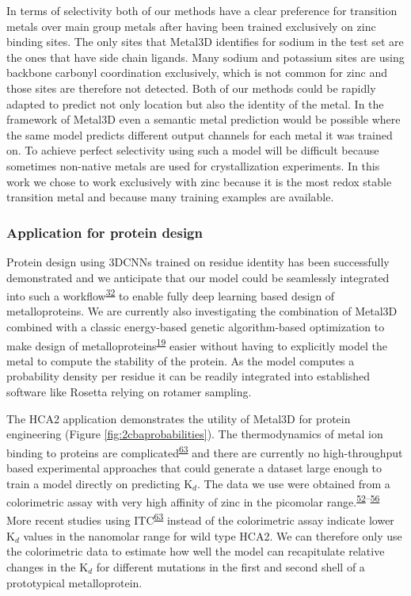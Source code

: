 \documentclass[ lineno,
  9pt]{elife}
\begin{document}
In terms of selectivity both of our methods have a clear preference for transition metals over main group metals after having been trained exclusively on zinc binding sites. The only sites that Metal3D identifies for sodium in the test set are the ones that have side chain ligands. Many sodium and potassium sites are using backbone carbonyl coordination exclusively, which is not common for zinc and those sites are therefore not detected. Both of our methods could be rapidly adapted to predict not only location but also the identity of the metal. In the framework of Metal3D even a semantic metal prediction would be possible where the same model predicts different output channels for each metal it was trained on. To achieve perfect selectivity using such a model will be difficult because sometimes non-native metals are used for crystallization experiments. In this work we chose to work exclusively with zinc because it is the most redox stable transition metal and because many training examples are available.

\hypertarget{application-for-protein-design}{%
\subsubsection{Application for protein design}\label{application-for-protein-design}}

Protein design using 3DCNNs trained on residue identity has been successfully demonstrated and we anticipate that our model could be seamlessly integrated into such a workflow\textsuperscript{\protect\hyperlink{ref-6szq3cwi}{32}} to enable fully deep learning based design of metalloproteins. We are currently also investigating the combination of Metal3D combined with a classic energy-based genetic algorithm-based optimization to make design of metalloproteins\textsuperscript{\protect\hyperlink{ref-nlfa683y}{19}} easier without having to explicitly model the metal to compute the stability of the protein. As the model computes a probability density per residue it can be readily integrated into established software like Rosetta relying on rotamer sampling.

The HCA2 application demonstrates the utility of Metal3D for protein engineering (Figure \ref{fig:2cbaprobabilities}). The thermodynamics of metal ion binding to proteins are complicated\textsuperscript{\protect\hyperlink{ref-TlDhIlX}{63}} and there are currently no high-throughput based experimental approaches that could generate a dataset large enough to train a model directly on predicting K$_d$. The data we use were obtained from a colorimetric assay with very high affinity of zinc in the picomolar range.\textsuperscript{\protect\hyperlink{ref-D3VQQdjb}{52}--\protect\hyperlink{ref-TNbPH3Y1}{56}} More recent studies using ITC\textsuperscript{\protect\hyperlink{ref-TlDhIlX}{63}} instead of the colorimetric assay indicate lower K$_d$ values in the nanomolar range for wild type HCA2. We can therefore only use the colorimetric data to estimate how well the model can recapitulate relative changes in the K$_d$ for different mutations in the first and second shell of a prototypical metalloprotein.
\end{document}
